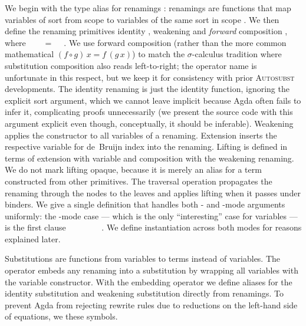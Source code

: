 \documentclass[a4paper,UKenglish,cleveref, autoref, thm-restate,anonymous]{lipics-v2021}
\begin{document}
We begin with the type alias for renamings : renamings are
functions that map variables of sort  from scope  to
variables of the same sort in scope . We then define the renaming
primitives identity , weakening  and
\textit{forward} composition , where
\AgdaSymbol{(}~~\AgdaSymbol{)}~~=~~\AgdaSymbol{(}~\AgdaSymbol{)}.
We use forward composition (rather than the more common mathematical
$(f \circ g)\, x = f\,(g\,x)$) to match the $σ$-calculus tradition where
substitution composition  also reads left-to-right; the
operator name  is unfortunate in this respect, but we keep it
for consistency with prior \textsc{Autosubst} developments. The identity
renaming is just the identity function, ignoring the explicit sort argument,
which we cannot leave implicit because Agda often fails to infer it, complicating
proofs unnecessarily (we present the source code with this argument explicit
even though, conceptually, it should be inferable). Weakening applies the
 constructor to all variables of a renaming.
Extension  inserts the respective variable for de~Bruijn
index  into the renaming. Lifting
 is defined in terms of extension with variable
 and composition with the weakening renaming.
We do not mark lifting opaque, because it is merely an alias for a term
constructed from other primitives. The traversal operation
 propagates the renaming through the nodes to the leaves
and applies lifting when it passes under binders. We give a single definition
that handles both - and
-mode arguments uniformly: the
-mode case --- which is the only ``interesting''
case for variables --- is the first clause
~\AgdaSymbol{\{}~\AgdaSymbol{=}~\AgdaSymbol{\}}~~~\AgdaSymbol{=}~~.
We define instantiation across both modes for reasons explained later.

Substitutions are functions from variables to terms instead of variables. The
operator  embeds any renaming into a substitution by
wrapping all variables with the variable constructor. With the embedding
operator we define aliases for the identity substitution  and
weakening substitution  directly from renamings. To prevent
Agda from rejecting rewrite rules due to reductions on the left-hand side of
equations, we  these symbols.
\end{document}
